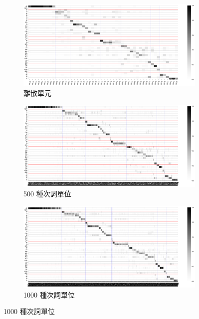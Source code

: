 {
    {
        \newcommand{\tempwidth}[0]{0.8\linewidth}
        \begin{figure}
             \centering
             \begin{subfigure}{\textwidth}
                 \centering
                 \includegraphics[width=\tempwidth]{figures/ch4figs/hub-u050-ap0000-givenunit-byphn.png}
                 \caption{離散單元}
                 \label{fig:hub-u050-ap0000-givenunit-byphn}
             \end{subfigure}
             \vfill
             \begin{subfigure}{\textwidth}
                 \centering
                 \includegraphics[width=\tempwidth]{figures/ch4figs/hub-u050-ap0500-givenunit-byphn.png}
                 \caption{500 種次詞單位}
                 \label{fig:hub-u050-ap0500-givenunit-byphn}
             \end{subfigure}
             \vfill
             \begin{subfigure}{\textwidth}
                 \centering
                 \includegraphics[width=\tempwidth]{figures/ch4figs/hub-u050-ap1000-givenunit-byphn.png}
                 \caption{1000 種次詞單位}
                 \label{fig:hub-u050-ap1000-givenunit-byphn}
             \end{subfigure}


\end{figure}}}
